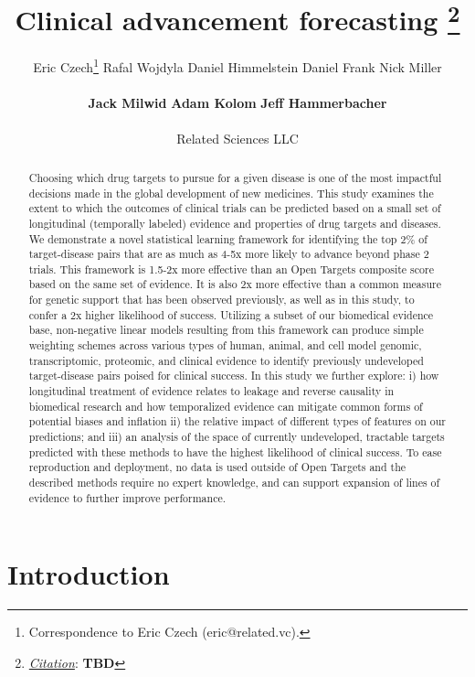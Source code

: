 \documentclass{article}
\title{Clinical advancement forecasting
\thanks{\textit{\underline{Citation}}: 
\textbf{TBD}} 
}
\author{
  Eric Czech\thanks{Correspondence to Eric Czech (eric@related.vc).} \hspace{0.2cm} 
  Rafal Wojdyla \hspace{0.2cm} 
  Daniel Himmelstein \hspace{0.2cm}
  Daniel Frank \hspace{0.2cm} 
  Nick Miller \hspace{0.2cm} 
  \\ \\
  \textbf{Jack Milwid} \hspace{0.2cm} 
  \textbf{Adam Kolom} \hspace{0.2cm} 
  \textbf{Jeff Hammerbacher}
  \\ \\
  Related Sciences LLC
}
\begin{document}
\maketitle


\def\evaluationDatasetPairCount{9010}
\def\topRankingPct{2}
\def\bottomRankingPct{98}

\begin{abstract}
Choosing which drug targets to pursue for a given disease is one of the most impactful decisions made in the global development of new medicines. This study examines the extent to which the outcomes of clinical trials can be predicted based on a small set of longitudinal (temporally labeled) evidence and properties of drug targets and diseases. We demonstrate a novel statistical learning framework for identifying the top \topRankingPct\% of target-disease pairs that are as much as 4-5x more likely to advance beyond phase 2 trials. This framework is 1.5-2x more effective than an Open Targets composite score based on the same set of evidence. It is also 2x more effective than a common measure for genetic support that has been observed previously, as well as in this study, to confer a 2x higher likelihood of success. Utilizing a subset of our biomedical evidence base, non-negative linear models resulting from this framework can produce simple weighting schemes across various types of human, animal, and cell model genomic, transcriptomic, proteomic, and clinical evidence to identify previously undeveloped target-disease pairs poised for clinical success. In this study we further explore: i) how longitudinal treatment of evidence relates to leakage and reverse causality in biomedical research and how temporalized evidence can mitigate common forms of potential biases and inflation ii) the relative impact of different types of features on our predictions; and iii) an analysis of the space of currently undeveloped, tractable targets predicted with these methods to have the highest likelihood of clinical success. To ease reproduction and deployment, no data is used outside of Open Targets and the described methods require no expert knowledge, and can support expansion of lines of evidence to further improve performance.
\end{abstract}

\section{Introduction}
\label{sec:introduction}
\end{document}
